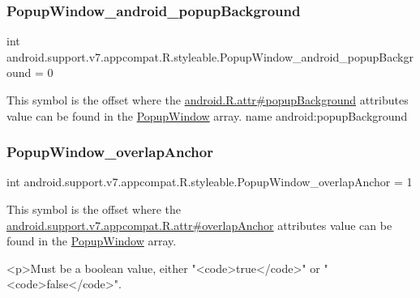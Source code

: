 \subsubsection{\texorpdfstring{Popup\+Window\+\_\+android\+\_\+popup\+Background}{PopupWindow\_android\_popupBackground}}
{\footnotesize\ttfamily int android.\+support.\+v7.\+appcompat.\+R.\+styleable.\+Popup\+Window\+\_\+android\+\_\+popup\+Background = 0\hspace{0.3cm}{\ttfamily [static]}}

This symbol is the offset where the \hyperlink{}{android.\+R.\+attr\#popup\+Background} attribute\textquotesingle{}s value can be found in the \hyperlink{classandroid_1_1support_1_1v7_1_1appcompat_1_1R_1_1styleable_abfcd5394a28e12e51efa5ac509687b26}{Popup\+Window} array.  name android\+:popup\+Background \mbox{\label{classandroid_1_1support_1_1v7_1_1appcompat_1_1R_1_1styleable_a749bd150019d301f69e89f29ccc9a35d}} 
\subsubsection{\texorpdfstring{Popup\+Window\+\_\+overlap\+Anchor}{PopupWindow\_overlapAnchor}}
{\footnotesize\ttfamily int android.\+support.\+v7.\+appcompat.\+R.\+styleable.\+Popup\+Window\+\_\+overlap\+Anchor = 1\hspace{0.3cm}{\ttfamily [static]}}

This symbol is the offset where the \hyperlink{classandroid_1_1support_1_1v7_1_1appcompat_1_1R_1_1attr_ad62e549e49cbd9c72df304e753d22158}{android.\+support.\+v7.\+appcompat.\+R.\+attr\#overlap\+Anchor} attribute\textquotesingle{}s value can be found in the \hyperlink{classandroid_1_1support_1_1v7_1_1appcompat_1_1R_1_1styleable_abfcd5394a28e12e51efa5ac509687b26}{Popup\+Window} array.

\begin{DoxyVerb}      <p>Must be a boolean value, either "<code>true</code>" or "<code>false</code>".
\end{DoxyVerb}
 

